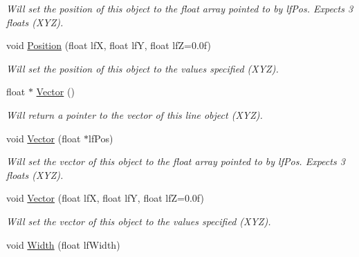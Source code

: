 \begin{DoxyCompactItemize}
\begin{DoxyCompactList}\small\item\em Will set the position of this object to the float array pointed to by lfPos. Expects 3 floats (XYZ). \end{DoxyCompactList}\item 
\hypertarget{classc_line_aedeac0c1874b8212e8cc878b920513d9}{
void \hyperlink{classc_line_aedeac0c1874b8212e8cc878b920513d9}{Position} (float lfX, float lfY, float lfZ=0.0f)}
\label{classc_line_aedeac0c1874b8212e8cc878b920513d9}

\begin{DoxyCompactList}\small\item\em Will set the position of this object to the values specified (XYZ). \end{DoxyCompactList}\item 
\hypertarget{classc_line_a4b37bd0ff6ea3834a2c49d5efbd222c9}{
float $\ast$ \hyperlink{classc_line_a4b37bd0ff6ea3834a2c49d5efbd222c9}{Vector} ()}
\label{classc_line_a4b37bd0ff6ea3834a2c49d5efbd222c9}

\begin{DoxyCompactList}\small\item\em Will return a pointer to the vector of this line object (XYZ). \end{DoxyCompactList}\item 
\hypertarget{classc_line_ad558bfa28a78a6594446ae0c5e11c262}{
void \hyperlink{classc_line_ad558bfa28a78a6594446ae0c5e11c262}{Vector} (float $\ast$lfPos)}
\label{classc_line_ad558bfa28a78a6594446ae0c5e11c262}

\begin{DoxyCompactList}\small\item\em Will set the vector of this object to the float array pointed to by lfPos. Expects 3 floats (XYZ). \end{DoxyCompactList}\item 
\hypertarget{classc_line_abfbbb77ed5b1c9208baf6d38b907b7b5}{
void \hyperlink{classc_line_abfbbb77ed5b1c9208baf6d38b907b7b5}{Vector} (float lfX, float lfY, float lfZ=0.0f)}
\label{classc_line_abfbbb77ed5b1c9208baf6d38b907b7b5}

\begin{DoxyCompactList}\small\item\em Will set the vector of this object to the values specified (XYZ). \end{DoxyCompactList}\item 
\hypertarget{classc_line_a4b02fb7febded866cc8fda351d623811}{
void \hyperlink{classc_line_a4b02fb7febded866cc8fda351d623811}{Width} (float lfWidth)}
\label{classc_line_a4b02fb7febded866cc8fda351d623811}


\end{DoxyCompactItemize}
